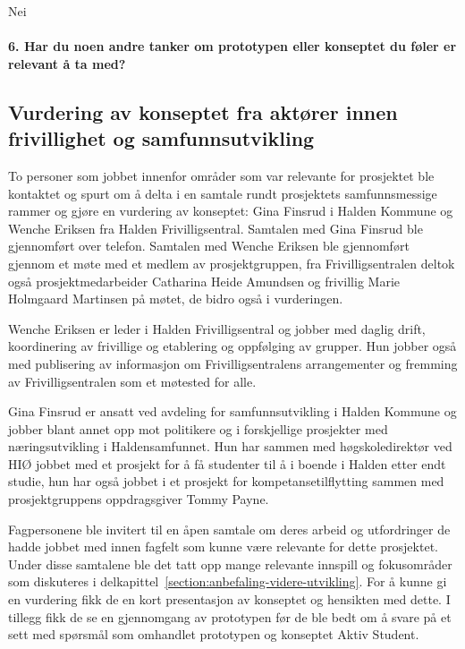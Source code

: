 Nei

\paragraph{6. Har du noen andre tanker om prototypen eller konseptet du føler er relevant å ta med?}


\subsection{Vurdering av konseptet fra aktører innen frivillighet og samfunnsutvikling}
To personer som jobbet innenfor områder som var relevante for prosjektet ble kontaktet og spurt om å delta i en samtale rundt prosjektets samfunnsmessige rammer og gjøre en vurdering av konseptet: Gina Finsrud i Halden Kommune og Wenche Eriksen fra Halden Frivilligsentral. Samtalen med Gina Finsrud ble gjennomført over telefon. Samtalen med Wenche Eriksen ble gjennomført gjennom et møte med et medlem av prosjektgruppen, fra Frivilligsentralen deltok også prosjektmedarbeider Catharina Heide Amundsen og frivillig Marie Holmgaard Martinsen på møtet, de bidro også i vurderingen.

Wenche Eriksen er leder i Halden Frivilligsentral og jobber med daglig drift, koordinering av frivillige og etablering og oppfølging av grupper. Hun jobber også med publisering av informasjon om Frivilligsentralens arrangementer og fremming av Frivilligsentralen som et møtested for alle. \cite{FRIVILLIGSENTRALEN-INTERVJU:21} 

Gina Finsrud er ansatt ved avdeling for samfunnsutvikling i Halden Kommune og jobber blant annet opp mot politikere og i forskjellige prosjekter med næringsutvikling i Haldensamfunnet. Hun har sammen med høgskoledirektør ved HIØ jobbet med et prosjekt for å få studenter til å i boende i Halden etter endt studie, hun har også jobbet i et prosjekt for kompetansetilflytting sammen med prosjektgruppens oppdragsgiver Tommy Payne. \cite{KOMMUNEN-INTERVJU:20} 

Fagpersonene ble invitert til en åpen samtale om deres arbeid og utfordringer de hadde jobbet med innen fagfelt som kunne være relevante for dette prosjektet. Under disse samtalene ble det tatt opp mange relevante innspill og fokusområder som diskuteres i delkapittel~\ref{section:anbefaling-videre-utvikling}. For å kunne gi en vurdering fikk de en kort presentasjon av konseptet og hensikten med dette. I tillegg fikk de se en gjennomgang av prototypen før de ble bedt om å svare på et sett med spørsmål som omhandlet prototypen og konseptet Aktiv Student.


